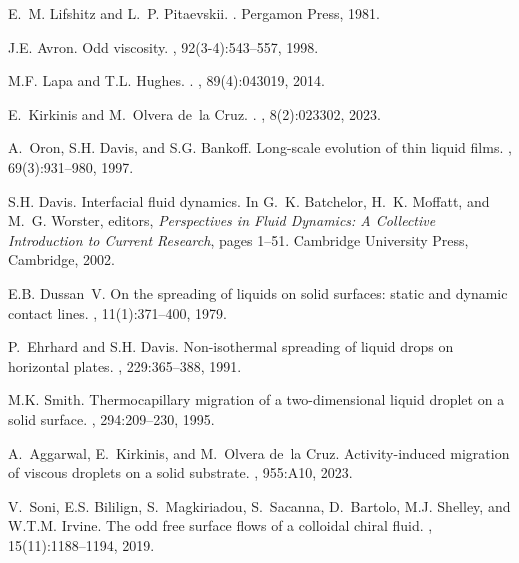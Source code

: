 \documentclass[%
 amsmath,amssymb,
 aps,
10.5pt]{revtex4-2}
\def\cprime{$'$}
\begin{document}
\def\cprime{$'$}
\begin{thebibliography}{10}
\makeatletter

\let\auto@bib@innerbib\@empty


E.~M. Lifshitz and L.~P. Pitaevskii.
.
\newblock Pergamon Press, 1981.

J.E. Avron.
\newblock Odd viscosity.
, 92(3-4):543--557, 1998.

M.F. Lapa and T.L. Hughes.
.
, 89(4):043019, 2014.

E.~Kirkinis and M.~Olvera de~la Cruz.
.
, 8(2):023302, 2023.

A.~Oron, S.H. Davis, and S.G. Bankoff.
\newblock Long-scale evolution of thin liquid films.
, 69(3):931--980, 1997.

S.H. Davis.
\newblock Interfacial fluid dynamics.
\newblock In G.~K. {Batchelor}, H.~K. {Moffatt}, and M.~G. {Worster}, editors,
  {\em Perspectives in Fluid Dynamics: A Collective Introduction to Current
  Research}, pages 1--51. Cambridge University Press, Cambridge, 2002.

E.B. Dussan~V.
\newblock On the spreading of liquids on solid surfaces: static and dynamic
  contact lines.
, 11(1):371--400, 1979.

P.~Ehrhard and S.H. Davis.
\newblock Non-isothermal spreading of liquid drops on horizontal plates.
, 229:365--388, 1991.

M.K. Smith.
\newblock Thermocapillary migration of a two-dimensional liquid droplet on a
  solid surface.
, 294:209--230, 1995.

A.~Aggarwal, E.~Kirkinis, and M.~Olvera de~la Cruz.
\newblock Activity-induced migration of viscous droplets on a solid substrate.
, 955:A10, 2023.

V.~Soni, E.S. Bililign, S.~Magkiriadou, S.~Sacanna, D.~Bartolo, M.J. Shelley,
  and W.T.M. Irvine.
\newblock The odd free surface flows of a colloidal chiral fluid.
, 15(11):1188--1194, 2019.


\end{thebibliography}
\end{document}
